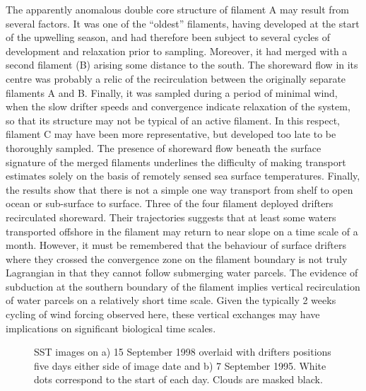 The apparently anomalous double core structure of filament A may
result from several factors. It was one of the ``oldest''
filaments, having developed at the start of the upwelling season,
and had therefore been subject to several cycles of development
and relaxation prior to sampling. Moreover, it had merged with a
second filament (B) arising some distance to the south.  The
shoreward flow in its centre was probably a relic of the
recirculation between the originally separate filaments A and B.
Finally, it was sampled during a period of minimal wind, when the
slow drifter speeds and convergence indicate relaxation of the
system, so that its structure may not be typical of an active
filament.  In this respect, filament C may have been more
representative, but developed too late to be thoroughly sampled.
The presence of shoreward flow beneath the surface signature of
the merged filaments underlines the difficulty of making transport
estimates solely on the basis of remotely sensed sea surface
temperatures. Finally, the results show that there is not a simple
one way transport from shelf to open ocean or sub-surface to
surface. Three of the four filament deployed drifters recirculated
shoreward.  Their trajectories suggests that at least some waters
transported offshore in the filament may return to near slope on a
time scale of a month. However, it must be remembered that the
behaviour of surface drifters where they crossed the convergence
zone on the filament boundary is not truly Lagrangian in that they
cannot follow submerging water parcels. The evidence of subduction
at the southern boundary of the filament implies vertical
recirculation of water parcels on a relatively short time scale.
Given the typically 2 weeks cycling of wind forcing observed here,
these vertical exchanges may have implications on significant
biological time scales.
\begin{figure}
\centering \arribacap%
%
%
\caption{SST images on a) 15 September 1998 overlaid with drifters
positions five days either side of image date
 and b) 7 September 1995. White dots
correspond to the start of each day. Clouds are masked black.}
\label{fig:cd114_satend}%
\end{figure}

